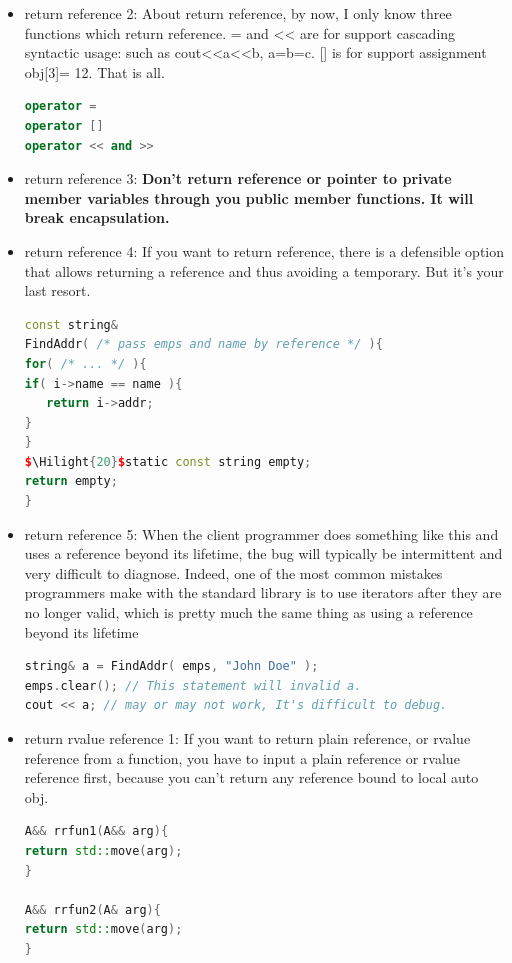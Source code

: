 \documentclass[a4paper,12pt,twoside]{book}
\newcommand{\Hilight}[1]{\makebox[0pt][l]{\color{yellow}\rule[-3pt]{#1em}{11pt}}}
\begin{document}
\begin{itemize}
\item return reference 2:  About return reference, by now, I only know three functions which return reference. = and << are for support cascading syntactic usage: such as cout<<a<<b, a=b=c.  [] is for support assignment obj[3]= 12.  That is all.
\begin{lstlisting}[frame=single, language=c++]
operator =
operator []
operator << and >>
\end{lstlisting}

\item return reference 3: \textbf{Don't return reference or pointer to private member variables through you public member functions. It will break encapsulation. }


\item return reference 4: If you want to return reference,  there is a defensible option that allows returning a reference and thus avoiding a temporary. But it's your last resort.
\begin{lstlisting}[frame=single, language=c++, mathescape=true]
const string&
FindAddr( /* pass emps and name by reference */ ){
for( /* ... */ ){
if( i->name == name ){
   return i->addr;
}
}
$\Hilight{20}$static const string empty;
return empty;
}
\end{lstlisting}
\item return reference 5:  When the client programmer does something like this and uses a reference beyond its lifetime, the bug will typically be intermittent and very difficult to diagnose. Indeed, one of the most common mistakes programmers make with the standard library is to use iterators after they are no longer valid, which is pretty much the same thing as using a reference beyond its lifetime
\begin{lstlisting}[frame=single, language=c++, mathescape=true]
string& a = FindAddr( emps, "John Doe" );
emps.clear(); // This statement will invalid a.
cout << a; // may or may not work, It's difficult to debug.
\end{lstlisting}

\item return rvalue reference 1:   If you want to return plain reference, or rvalue reference from a function, you have to input a plain reference or rvalue reference first, because you can't return any reference bound to local auto obj.
\begin{lstlisting}[frame=single, language=c++]
A&& rrfun1(A&& arg){
return std::move(arg);
}

A&& rrfun2(A& arg){
return std::move(arg);
}


\end{lstlisting}
\end{itemize}
\end{document}
